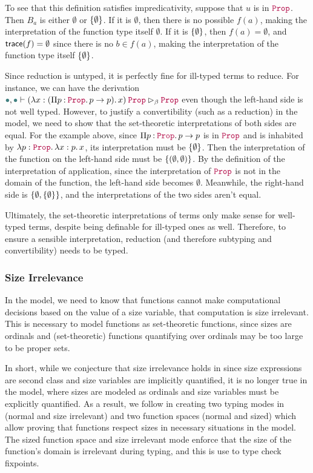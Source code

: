 To see that this definition satisfies impredicativity,
suppose that $u$ is in $\Prop$.
Then $B_a$ is either $\emptyset$ or $\{\emptyset\}$.
If it is $\emptyset$, then there is no possible $f(a)$,
making the interpretation of the function type itself $\emptyset$.
If it is $\{\emptyset\}$, then $f(a) = \emptyset$,
and $\textsf{trace}(f) = \emptyset$ since there is no $b \in f(a)$,
making the interpretation of the function type itself $\{\emptyset\}$.

Since reduction is untyped, it is perfectly fine for ill-typed terms to reduce.
For instance, we can have the derivation
$\mt, \mt \vdash \app{(\abs{x}{(\prod{p}{\Prop}{p \to p})}{x})}{\Prop} \rhd_\beta \Prop$
even though the left-hand side is not well typed.
However, to justify a convertibility (such as a reduction) in the model,
we need to show that the set-theoretic interpretations of both sides are equal.
For the example above, since $\prod{p}{\Prop}{p \to p}$ is in $\Prop$
and is inhabited by $\abs{p}{\Prop}{\abs{x}{p}{x}}$,
its interpretation must be $\{\emptyset\}$.
Then the interpretation of the function on the left-hand side must be $\{(\emptyset, \emptyset)\}$.
By the definition of the interpretation of application,
since the interpretation of $\Prop$ is not in the domain of the function,
the left-hand side becomes $\emptyset$.
Meanwhile, the right-hand side is $\{\emptyset, \{\emptyset\}\}$,
and the interpretations of the two sides aren't equal.

Ultimately, the set-theoretic interpretations of terms only make sense for well-typed terms,
despite being definable for ill-typed ones as well.
Therefore, to ensure a sensible interpretation,
reduction (and therefore subtyping and convertibility) needs to be typed.

\subsubsection{Size Irrelevance}

In the model, we need to know that functions cannot make computational decisions
based on the value of a size variable, \ie that computation is size irrelevant.
This is necessary to model functions as set-theoretic functions, since sizes are
ordinals and (set-theoretic) functions quantifying over ordinals may be too
large to be proper sets.

In short, while we conjecture that size irrelevance holds in \lang since size
expressions are second class and size variables are implicitly quantified, it is
no longer true in the model, where sizes are modeled as ordinals and size
variables must be explicitly quantified.
As a result, we follow \citet{barras-thesis} in creating two typing modes in
\langAnother (normal and size irrelevant) and two function spaces (normal
and sized) which allow proving that functions respect sizes in necessary
situations in the model.
The sized function space and size irrelevant mode enforce that the size of the
function's domain is irrelevant during typing, and this is use to type check
fixpoints.

